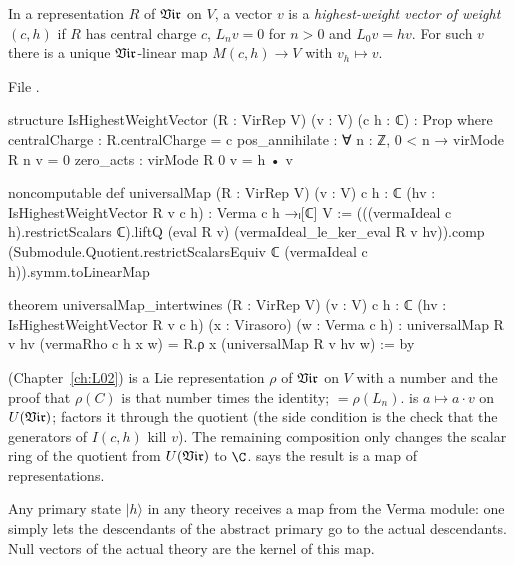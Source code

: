 \begin{definition}\label{l06:def:hwv}
In a representation $R$ of $\mathfrak{Vir}$ on $V$, a vector $v$ is a \emph{highest-weight vector of weight
$(c,h)$} if $R$ has central charge $c$, $L_nv = 0$ for $n>0$ and $L_0v = hv$. For such $v$ there is a
unique $\mathfrak{Vir}$-linear map $M(c,h)\to V$ with $v_h\mapsto v$.
\end{definition}

File .
\begin{leancode}
structure IsHighestWeightVector (R : VirRep V) (v : V) (c h : ℂ) : Prop where
  centralCharge : R.centralCharge = c
  pos_annihilate : ∀ n : ℤ, 0 < n → virMode R n v = 0
  zero_acts : virMode R 0 v = h • v

noncomputable def universalMap (R : VirRep V) (v : V) {c h : ℂ}
    (hv : IsHighestWeightVector R v c h) : Verma c h →ₗ[ℂ] V :=
  (((vermaIdeal c h).restrictScalars ℂ).liftQ (eval R v)
      (vermaIdeal_le_ker_eval R v hv)).comp
    (Submodule.Quotient.restrictScalarsEquiv ℂ (vermaIdeal c h)).symm.toLinearMap

theorem universalMap_intertwines (R : VirRep V) (v : V) {c h : ℂ}
    (hv : IsHighestWeightVector R v c h) (x : Virasoro) (w : Verma c h) :
    universalMap R v hv (vermaRho c h x w) =
      R.ρ x (universalMap R v hv w) := by
\end{leancode}

\begin{dictionary}
 (Chapter~\ref{ch:L02}) is a Lie representation $\rho$ of $\mathfrak{Vir}$ on $V$ with a number
 and the proof that $\rho(C)$ is that number times the identity; 
$= \rho(L_n)$.  is $a\mapsto a\cdot v$ on $U(\mathfrak{Vir})$;  factors it through the
quotient (the side condition  is the check that the generators of $I(c,h)$
kill $v$). The remaining composition only changes the scalar ring of the quotient from $U(\mathfrak{Vir})$ to $\C$.
\allowbreak{} says the result is a map of representations.
\end{dictionary}

\begin{physics}
Any primary state $|h\rangle$ in any theory receives a map from the Verma module: one simply lets the
descendants of the abstract primary go to the actual descendants. Null vectors of the actual theory are
the kernel of this map.
\end{physics}


